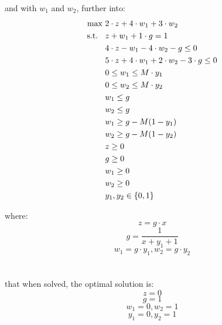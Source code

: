 \documentclass{article}
\begin{document}
and with $w_1$ and $w_2$, further into: 
    \begin{equation}
    \begin{split}
        \text{max\space} & 2 \cdot z + 4 \cdot w_1 + 3 \cdot w_2\\
        \text{s.t. \space} & z + w_1 + 1 \cdot g = 1\\
        & \space 4 \cdot z - w_1 - 4 \cdot w_2 - g \leq 0\\
        & 5 \cdot z + 4 \cdot w_1 + 2 \cdot w_2 - 3 \cdot g \leq 0\\
        & 0 \leq w_1 \leq M \cdot y_1\\
        & 0 \leq w_2 \leq M \cdot y_2\\
        & w_1 \leq g\\
        & w_2 \leq g\\
        & w_1 \geq g - M(1 - y_1)\\
        & w_2 \geq g - M(1 - y_2)\\
        & z \geq 0\\
        & g \geq 0\\
        & w_1 \geq 0\\
        & w_2 \geq 0\\
        & y_1, y_2 \in \{0, 1\}
    \end{split}
    \end{equation}

where:
    \begin{equation}\nonumber
        z = g \cdot x
    \end{equation}
    \begin{equation}
        g = \frac{1}{x + y_1 + 1}
    \end{equation}
    \begin{equation}\nonumber
        w_1 = g \cdot y_1, w_2 = g \cdot y_2 
    \end{equation}
\\~\\
that when solved, the optimal solution is:
    \begin{equation}\nonumber
        z = 0        
    \end{equation}
    \begin{equation}\nonumber
        g = 1
    \end{equation}
    \begin{equation}
        w_1 = 0, w_2 = 1
    \end{equation}
    \begin{equation}\nonumber
        y_1 = 0, y_2 = 1
    \end{equation}
\end{document}
